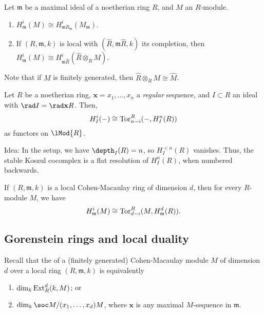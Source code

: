 \documentclass[12pt]{article}
\begin{document}
\begin{prop}
	Let $\mathfrak{m}$ be a maximal ideal of a noetherian ring $R$, and $M$ an $R$-module.
	\begin{enumerate}[label=(\alph*)]
		\item $H_{\mathfrak{m}}^{i}(M) \cong H_{\mathfrak{m} R_{\mathfrak{m}}}^{i}(M_{\mathfrak{m}})$.
		\item If $(R, \mathfrak{m}, k)$ is local with $(\widehat{R}, \mathfrak{m} \widehat{R}, k)$ its completion, then $H_{\mathfrak{m}}^{i}(M) \cong H_{\mathfrak{m} \widehat{R}}^{i}(\widehat{R} \otimes_{R} M)$.
	\end{enumerate}
\end{prop}
Note that if $M$ is finitely generated, then $\widehat{R} \otimes_{R} M \cong \widehat{M}$.

\begin{lem} 
	Let $R$ be a noetherian ring, $\mathbf{x} = x_{1}, \ldots, x_{n}$ a \emph{regular} sequence, and $I \subset R$ an ideal with $\rad I = \rad \mathbf{x} R$. Then,
	\begin{equation*} 
		H_{I}^{i}(-) \cong \operatorname{Tor}^{R}_{n - i}(-, H_{I}^{n}(R))
	\end{equation*}
	as functors on $\lMod{R}$.
\end{lem}
Idea: In the setup, we have $\depth_{I}(R) = n$, so $H_{I}^{<n}(R)$ vanishes. Thus, the stable Koszul cocomplex is a flat resolution of $H_{I}^{n}(R)$, when numbered backwards.

\begin{cor} \label{cor:cohen-macaulay-local-cohomology-tor}
	If $(R, \mathfrak{m}, k)$ is a local Cohen-Macaulay ring of dimension $d$, then for every $R$-module $M$, we have
	\begin{equation*} 
		H_{\mathfrak{m}}^{i}(M) \cong \operatorname{Tor}^{R}_{d - i}(M, H_{\mathfrak{m}}^{d}(R)).
	\end{equation*}
\end{cor}

\subsection{Gorenstein rings and local duality}

Recall that the  of a (finitely generated) Cohen-Macaulay module $M$ of dimension $d$ over a local ring $(R, \mathfrak{m}, k)$ is equivalently
\begin{enumerate}[label=(\alph*)]
	\item $\dim_{k} \operatorname{Ext}_{R}^{d}(k, M)$; or
	\item $\dim_{k} \soc M/(x_{1}, \ldots, x_{d}) M$, where $\mathbf{x}$ is any maximal $M$-sequence in $\mathfrak{m}$.
\end{enumerate}	
\end{document}
